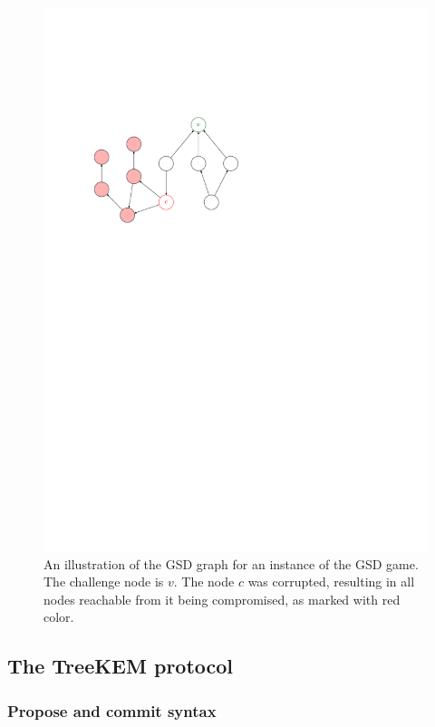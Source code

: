 \begin{figure}
	\begin{center}
		\includegraphics{figures/gsd-example}
	\end{center}
	\caption{An illustration of the GSD graph for an instance of the GSD game. The challenge node is $v$. The node $c$ was corrupted, resulting in all nodes reachable from it being compromised, as marked with red color.} \label{fig:gsd-example}
\end{figure}

\subsection{The TreeKEM protocol}

\subsubsection{Propose and commit syntax}

